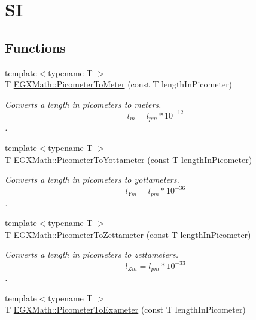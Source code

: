 \hypertarget{group___e_g_x_math-_conversions-_length_conversions-_picometer-_s_i}{}\section{SI}
\label{group___e_g_x_math-_conversions-_length_conversions-_picometer-_s_i}
\subsection*{Functions}
\begin{DoxyCompactItemize}
\item 
{\footnotesize template$<$typename T $>$ }\\T \mbox{\hyperlink{group___e_g_x_math-_conversions-_length_conversions-_picometer-_s_i_gab975f2eb902fcbb745ee4edbbf611f69}{E\+G\+X\+Math\+::\+Picometer\+To\+Meter}} (const T length\+In\+Picometer)
\begin{DoxyCompactList}\small\item\em Converts a length in picometers to meters. \[ l_{m}=l_{pm} * 10^{-12} \]. \end{DoxyCompactList}\item 
{\footnotesize template$<$typename T $>$ }\\T \mbox{\hyperlink{group___e_g_x_math-_conversions-_length_conversions-_picometer-_s_i_ga02d71cee34c4570a0c17529eb481a26f}{E\+G\+X\+Math\+::\+Picometer\+To\+Yottameter}} (const T length\+In\+Picometer)
\begin{DoxyCompactList}\small\item\em Converts a length in picometers to yottameters. \[ l_{Ym}=l_{pm} * 10^{-36} \]. \end{DoxyCompactList}\item 
{\footnotesize template$<$typename T $>$ }\\T \mbox{\hyperlink{group___e_g_x_math-_conversions-_length_conversions-_picometer-_s_i_gae3d104d5bddc3f76d951fb0c86aa31ca}{E\+G\+X\+Math\+::\+Picometer\+To\+Zettameter}} (const T length\+In\+Picometer)
\begin{DoxyCompactList}\small\item\em Converts a length in picometers to zettameters. \[ l_{Zm}=l_{pm} * 10^{-33} \]. \end{DoxyCompactList}\item 
{\footnotesize template$<$typename T $>$ }\\T \mbox{\hyperlink{group___e_g_x_math-_conversions-_length_conversions-_picometer-_s_i_gaa62371decac9806280c05abaffc3b460}{E\+G\+X\+Math\+::\+Picometer\+To\+Exameter}} (const T length\+In\+Picometer)

\end{DoxyCompactItemize}
